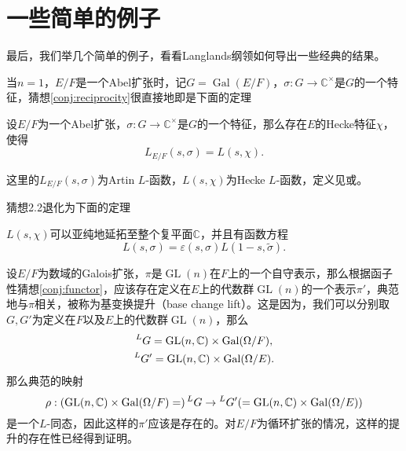 \section{一些简单的例子}
\label{sec:eg}
最后，我们举几个简单的例子，看看Langlands纲领如何导出一些经典的结果。

\begin{example}
当$n = 1$，$E/F$是一个Abel扩张时，记$G = \operatorname{Gal}(E/F)$，$\sigma: G \rightarrow \mathbb{C}^\times$是$G$的一个特征，猜想\ref{conj:reciprocity}很直接地即是下面的定理
\end{example}

\begin{theorem}[Artin]
设$E/F$为一个Abel扩张，$\sigma: G \rightarrow \mathbb{C}^\times$是$G$的一个特征，那么存在$E$的Hecke特征$\chi$，使得
$$
L_{E/F}(s, \sigma) = L(s, \chi).
$$
\end{theorem}

这里的$L_{E/F}(s, \sigma)$为Artin $L$-函数，$L(s, \chi)$为Hecke $L$-函数，定义见或。

猜想2.2退化为下面的定理

\begin{theorem}
$L(s, \chi)$可以亚纯地延拓至整个复平面$\mathbb{C}$，并且有函数方程
$$
L(s, \sigma) = \varepsilon(s, \sigma) L(1-s, \widetilde{\sigma}).
$$
\end{theorem}

\begin{example}
设$E/F$为数域的Galois扩张，$\pi$是$\operatorname{GL}(n)$在$F$上的一个自守表示，那么根据函子性猜想\ref{conj:functor}，应该存在定义在$E$上的代数群$\operatorname{GL}(n)$的一个表示$\pi'$，典范地与$\pi$相关，被称为基变换提升（base change lift）。这是因为，我们可以分别取$G,G'$为定义在$F$以及$E$上的代数群$\operatorname{GL}(n)$，那么
\begin{gather*}
\prescript{L}{}{G} = \operatorname{GL}(n, \mathbb{C}) \times \operatorname{Gal}(\Omega/F), \\
\prescript{L}{}{G}' = \operatorname{GL}(n, \mathbb{C}) \times \operatorname{Gal}(\Omega/E).
\end{gather*}
那么典范的映射
$$
\rho: (\operatorname{GL}(n, \mathbb{C}) \times \operatorname{Gal}(\Omega/F) = ) \prescript{L}{}{G} \rightarrow \prescript{L}{}{G}' ( = \operatorname{GL}(n, \mathbb{C}) \times \operatorname{Gal}(\Omega/E))
$$
是一个$L$-同态，因此这样的$\pi'$应该是存在的。对$E/F$为循环扩张的情况，这样的提升的存在性已经得到证明\cite{bump1998automorphic}。
\end{example}
